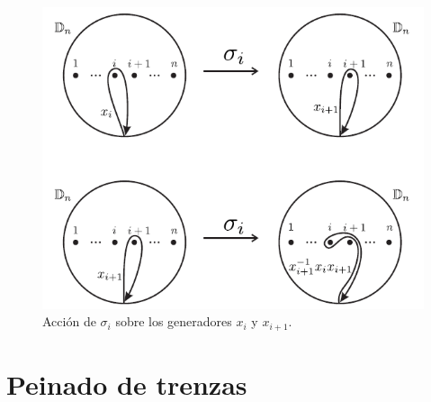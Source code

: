\documentclass{beamer}
\theoremstyle{definition}
\newtheorem{teorema}{Teorema}
\begin{document}
\begin{frame}
\begin{figure}[h!]
\includegraphics[scale=0.5]{Imagenes/auto.png}
\caption{Acción de $\sigma_i$ sobre los generadores $x_i$ y $x_{i+1}$.}
\end{figure}
\end{frame}

%

\section{Peinado de trenzas}
%
\end{document}
